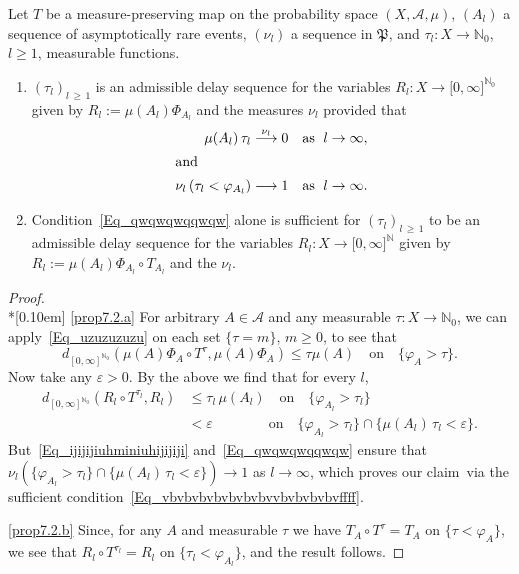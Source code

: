 \documentclass[10pt]{amsart}
\theoremstyle{definition}\newtheorem{defi}[theo]{Definition}\newtheorem{rema}[theo]{Remark}\newtheorem{exam}[theo]{Example}\newtheorem{exem}[theo]{Example}\newtheorem{nota}[theo]{Notation}
\newcommand{\clA}{\mathcal{A}}
\newcommand{\frkP}{\mathfrak{P}}
\newcommand{\bbN}{\mathbb{N}}
\newcommand*{\alphenumi}{\renewcommand*{\theenumi}{\alph{enumi}}}
\begin{document}
\begin{prop}\label{P_CharAdmissTimeDelay}
Let $T$ be a measure-preserving map on the probability space $(X,\clA,\mu)$, $(A_{l})$ a sequence of asymptotically rare events, $(\nu_{l})$ a sequence in $\frkP$, and $\tau_{l}:X\rightarrow\bbN_{0}$, $l\geq1$, measurable functions.
\begin{enumerate}\alphenumi
\item \label{prop7.2.a}$(\tau_{l})_{l\,\geq\,1}$ is an admissible delay sequence for the variables $R_{l}:X\rightarrow\lbrack0,\infty]^{\bbN_{0}}$ given by $R_{l}:=\mu(A_{l})\Phi_{A_{l}}$ and the measures $\nu_{l}$ provided that
\begin{align}\mu(A_{l})\,\tau_{l}\overset{\nu_{l}}{\longrightarrow}0\quad &\text{as }\;l\rightarrow\infty,
\label{Eq_ijijijiuhminiuhijijiji} 
\\
\intertext{and}
\nu_{l}\left(\tau_{l}<\varphi_{A_{l}}\right) \longrightarrow1\quad &\text{as }\;l\rightarrow\infty. 
\label{Eq_qwqwqwqqwqw}
\end{align}
\item\label{prop7.2.b} Condition~\eqref{Eq_qwqwqwqqwqw} alone is sufficient for $(\tau_{l})_{l\,\geq\,1}$ to be an admissible delay sequence for the variables $R_{l}:X\rightarrow\lbrack0,\infty]^{\bbN}$ given by $R_{l}:=\mu (A_{l})\Phi_{A_{l}}\circ T_{A_{l}}$ and the $\nu_{l}$.
\end{enumerate}
\end{prop}

\begin{proof}\ \\*[0.10em]
\eqref{prop7.2.a} For arbitrary $A\in\clA$ and any measurable $\tau :X\rightarrow\bbN_{0}$, we can apply~\eqref{Eq_uzuzuzuzu} on each set $\{\tau=m\}$, $m\geq0$, to see that
\begin{equation}
d_{[0,\infty]^{\bbN_{0}}}(\mu(A)\Phi_{A}\circ T^{\tau},\mu(A)\Phi _{A})\leq\tau\mu(A) \quad\text{on}\quad\{\varphi_{A}>\tau\}.
\end{equation}
Now take any $\varepsilon>0$. By the above we find that for every $l$,
\begin{align}
d_{[0,\infty]^{\bbN_{0}}}(R_{l}\circ T^{\tau_{l}},R_{l}) & \leq
\tau_{l}\,\mu(A_{l})\quad\text{on}\quad\{\varphi_{A_{l}}>\tau_{l}\}\nonumber\\
& <\varepsilon\qquad\qquad \!\text{on}\quad
\{\varphi_{A_{l}}>\tau_{l}\}\cap
\{\mu(A_{l})\,\tau_{l}<\varepsilon\}.
\end{align}
But~\eqref{Eq_ijijijiuhminiuhijijiji} and~\eqref{Eq_qwqwqwqqwqw} ensure that $\nu_{l}(\{\varphi_{A_{l}}>\tau_{l}\}\cap\{\mu(A_{l})\,\tau_{l}<\varepsilon
\})\rightarrow1$ as $l\rightarrow\infty$, which proves our claim~via the sufficient condition~\eqref{Eq_vbvbvbvbvbvbvbvvbvbvbvbvffff}.

\vspace{4pt}
\noindent\eqref{prop7.2.b} Since, for any $A$ and measurable $\tau$ we have $T_{A}\circ T^{\tau}=T_{A}$ on $\{\tau<\varphi_{A}\}$, we see that $R_{l}\circ T^{\tau _{l}}=R_{l}$ on $\{\tau_{l}<\varphi_{A_{l}}\}$, and the result follows.
\end{proof}
\end{document}

